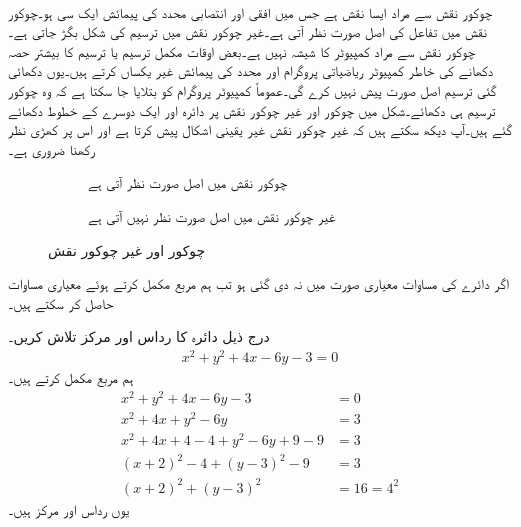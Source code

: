  \quad {}\\
چوکور نقش سے مراد ایسا نقش ہے جس میں افقی اور انتصابی محدد کی پیمائش ایک  سی  ہو۔چوکور نقش میں تفاعل کی اصل صورت نظر آتی ہے۔غیر چوکور نقش میں ترسیم کی شکل بگڑ جاتی ہے۔چوکور نقش سے مراد کمپیوٹر کا شیشہ نہیں ہے۔بعض اوقات مکمل ترسیم یا ترسیم کا بیشتر حصہ دکھانے کی خاطر کمپیوٹر ریاضیاتی پروگرام  اور  محدد کی پیمائش غیر یکساں کرتے ہیں۔یوں دکھائی گئی ترسیم اصل صورت پیش نہیں کرے گی۔عموماً کمپیوٹر پروگرام کو بتلایا جا سکتا ہے کہ وہ چوکور ترسیم ہی دکھائے۔شکل  میں چوکور اور غیر چوکور نقش پر دائرہ اور ایک دوسرے کے   خطوط  دکھائے گئے ہیں۔آپ دیکھ سکتے ہیں کہ غیر چوکور نقش غیر یقینی اشکال پیش کرتا ہے اور اس پر کھڑی نظر رکھنا ضروری ہے۔
\begin{figure}
\centering
\begin{subfigure}{0.5\textwidth}
\centering
{}
\caption{چوکور نقش میں اصل صورت نظر آتی ہے}
\end{subfigure}%
\begin{subfigure}{0.5\textwidth}
\centering
{}
\caption{غیر چوکور نقش میں اصل صورت نظر نہیں آتی ہے}
\end{subfigure}%
\caption{چوکور اور غیر چوکور نقش}
\label{شکل_ابتدا_چوکور_غیر_چکر_نقش}
\end{figure}

اگر دائرے کی مساوات معیاری صورت میں نہ دی گئی ہو تب ہم مربع مکمل کرتے ہوئے معیاری مساوات حاصل کر سکتے ہیں۔

درج ذیل دائرہ کا رداس اور مرکز تلاش کریں۔
\begin{align*}
x^2+y^2+4x-6y-3=0
\end{align*}
ہم مربع مکمل کرتے ہیں۔
\begin{align*}
x^2+y^2+4x-6y-3&=0\\
x^2+4x+y^2-6y&=3\\
x^2+4x+4-4+y^2-6y+9-9&=3\\
(x+2)^2-4+(y-3)^2-9&=3\\
(x+2)^2+(y-3)^2&=16=4^2
\end{align*}
یوں رداس  اور مرکز  ہیں۔

